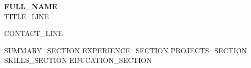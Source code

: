 \documentclass[10pt,a4paper]{article}
\begin{document}
\begin{center}
{\LARGE \textbf{{{FULL_NAME}}}} \\[3pt]
{{TITLE_LINE}}
\vspace{5pt}

{{CONTACT_LINE}}
\end{center}

{{SUMMARY_SECTION}}
{{EXPERIENCE_SECTION}}
{{PROJECTS_SECTION}}
{{SKILLS_SECTION}}
{{EDUCATION_SECTION}}
\end{document}
